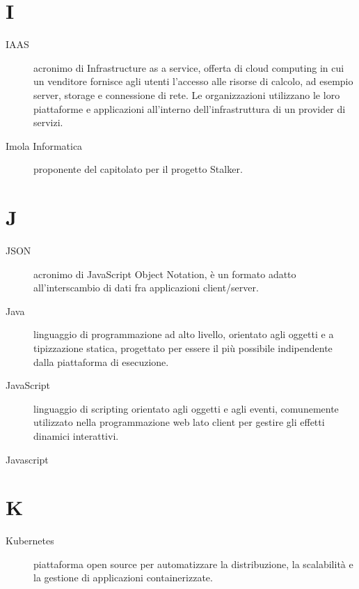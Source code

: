 \documentclass{article}
\begin{document}
\section{I}
\begin{description}
  \item[IAAS] acronimo di Infrastructure as a service, offerta di cloud computing in cui un venditore fornisce agli utenti l'accesso alle risorse di calcolo, ad esempio server, storage e connessione di rete. Le organizzazioni utilizzano le loro piattaforme e applicazioni all'interno dell'infrastruttura di un provider di servizi.
  \item[Imola Informatica] proponente del capitolato per il progetto Stalker.
\end{description}
\newpage
\section{J}
\begin{description}
  \item[JSON] acronimo di JavaScript Object Notation, è un formato adatto all'interscambio di dati fra applicazioni client/server.
  \item[Java] linguaggio di programmazione ad alto livello, orientato agli oggetti e a tipizzazione statica, progettato per essere il più possibile indipendente dalla piattaforma di esecuzione.
  \item[JavaScript] linguaggio di scripting orientato agli oggetti e agli eventi, comunemente utilizzato nella programmazione web lato client per gestire gli effetti dinamici interattivi.
  \item[Javascript] 
\end{description}
\newpage
\section{K}
\begin{description}
  \item[Kubernetes] piattaforma open source per automatizzare la distribuzione, la scalabilità e la gestione di applicazioni containerizzate.
\end{description}
\newpage
\end{document}
